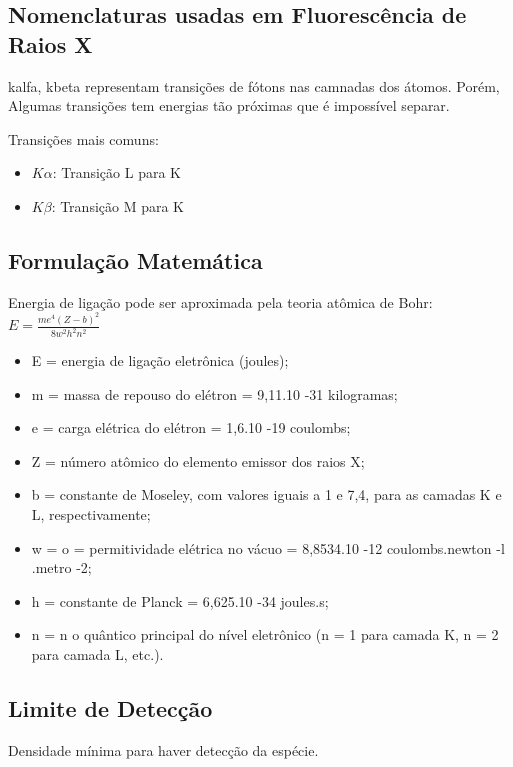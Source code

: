 \subsection{Nomenclaturas usadas em Fluorescência de Raios X}
kalfa, kbeta representam transições de fótons nas camnadas dos átomos.
Porém, Algumas transições tem energias tão próximas que é impossível separar.

Transições mais comuns:
\begin{itemize}
  \item $K\alpha$: Transição L para K
  \item $K\beta$: Transição M para K
\end{itemize}


\subsection{Formulação Matemática}

Energia de ligação pode ser aproximada pela teoria atômica de Bohr:
\begin{math}
E = \frac{me^4(Z-b)^2}{8w^2h^2n^2}
\end{math}

\begin{itemize}
  \item E = energia de ligação eletrônica (joules);
  \item m = massa de repouso do elétron = 9,11.10 -31 kilogramas;
  \item e = carga elétrica do elétron = 1,6.10 -19 coulombs;
  \item Z = número atômico do elemento emissor dos raios X;
  \item b = constante de Moseley, com valores iguais a 1 e 7,4, 
        para as camadas K e L, respectivamente;
  \item w = o = permitividade elétrica no vácuo = 8,8534.10 -12 
        coulombs.newton -l .metro -2;
  \item h = constante de Planck = 6,625.10 -34 joules.s;
  \item n = n o quântico principal do nível eletrônico 
        (n = 1 para camada K, n = 2 para camada L, etc.).
\end{itemize}

\subsection{Limite de Detecção}

Densidade mínima para haver detecção da espécie. 


